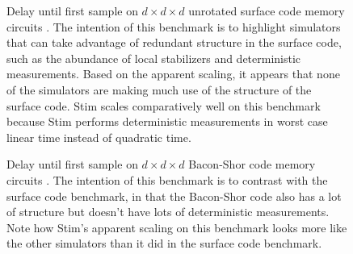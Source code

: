 \documentclass[onecolumn,unpublished]{quantumarticle}
\theoremstyle{definition}
\theoremstyle{definition}
\theoremstyle{definition}
\begin{document}
\begin{figure}
    \centering
    \caption{
        Delay until first sample on $d \times d \times d$ unrotated surface code memory circuits \cite{horsman2012latticesurgery}.
        The intention of this benchmark is to highlight simulators that can take advantage of redundant structure in the surface code, such as the abundance of local stabilizers and deterministic measurements.
        Based on the apparent scaling, it appears that none of the simulators are making much use of the structure of the surface code.
        Stim scales comparatively well on this benchmark because Stim performs deterministic measurements in worst case linear time instead of quadratic time.
    }
    \label{fig:bench-surface}
\end{figure}

\begin{figure}
    \centering
    \caption{
        Delay until first sample on $d \times d \times d$ Bacon-Shor code memory circuits \cite{bacon2006operator}.
        The intention of this benchmark is to contrast with the surface code benchmark, in that the Bacon-Shor code also has a lot of structure but doesn't have lots of deterministic measurements.
        Note how Stim's apparent scaling on this benchmark looks more like the other simulators than it did in the surface code benchmark.
    }
    \label{fig:bench-bacon}
\end{figure}
\end{document}
